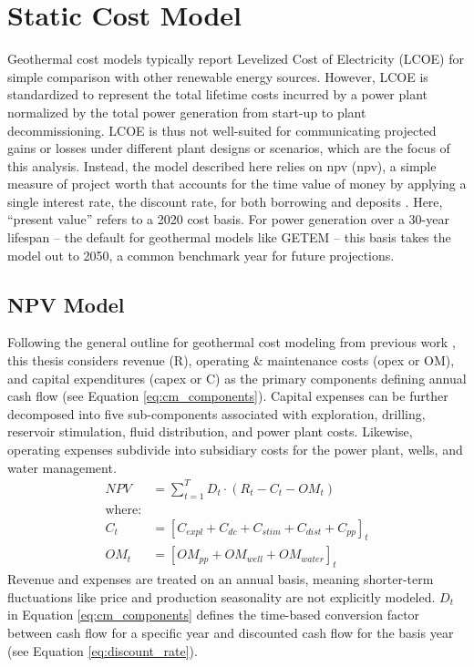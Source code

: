 \section{Static Cost Model}\label{ch4:cm_structure}
Geothermal cost models typically report Levelized Cost of Electricity (LCOE) for simple comparison with other renewable energy sources. However, LCOE is standardized to represent the total lifetime costs incurred by a power plant normalized by the total power generation from start-up to plant decommissioning. LCOE is thus not well-suited for communicating projected gains or losses under different plant designs or scenarios, which are the focus of this analysis. Instead, the model described here relies on \acrlong{npv} (\acrshort{npv}), a simple measure of project worth that accounts for the time value of money by applying a single interest rate, the discount rate, for both borrowing and deposits \citep[p.\ 195-215]{de_neufville_flexibility_2011}. Here, ``present value'' refers to a 2020 cost basis. For power generation over a 30-year lifespan -- the default for geothermal models like GETEM \citep{entingh_volume_2006} -- this basis takes the model out to 2050, a common benchmark year for future projections. 

\subsection{NPV Model}\label{ch4:cm_npv}
Following the general outline for geothermal cost modeling from previous work \citep[e.g.,][]{augustine_hydrothermal_2009, beckers_introducing_2013,tester_future_2006}, this thesis considers revenue (R), operating \& maintenance costs (\acrshort{opex} or OM), and capital expenditures (\acrshort{capex} or C) as the primary components defining annual cash flow (see Equation \ref{eq:cm_components}). Capital expenses can be further decomposed into five  sub-components associated with exploration, drilling, reservoir stimulation, fluid distribution, and power plant costs. Likewise, operating expenses subdivide into subsidiary costs for the power plant, wells, and water management.
\begin{equation}
    \label{eq:cm_components}
    \begin{aligned}
    NPV &= \sum_{t=1}^{T}D_t \cdot \left( R_t - C_t - OM_t \right)\\
    \text{where:}\\
    C_t &= \left[C_{expl} + C_{dc} + C_{stim} + C_{dist} + C_{pp}\right]_t\\
    OM_t &= \left[OM_{pp} + OM_{well} + OM_{water}\right]_t
    \end{aligned}
\end{equation}
Revenue and expenses are treated on an annual basis, meaning shorter-term fluctuations like price and production seasonality are not explicitly modeled. $D_t$ in Equation \ref{eq:cm_components} defines the time-based conversion factor between cash flow for a specific year and discounted cash flow for the basis year (see Equation \ref{eq:discount_rate}).

